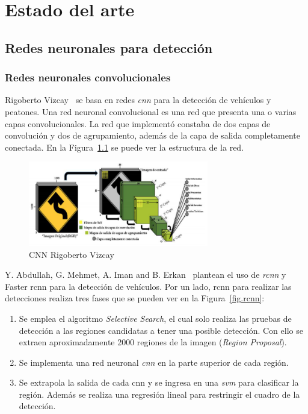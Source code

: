 \chapter{Estado del arte}\label{cap.estado}

\section{Redes neuronales para detección}
\label{sec:nets}


\subsection{Redes neuronales convolucionales}

Rigoberto Vizcay~\cite{tesis_rigoberto} se basa en redes \textit{\acrfull{cnn}} para la detección de vehículos y peatones. Una red neuronal convolucional es una red que presenta una o varias capas convolucionales. La red que implementó constaba de dos capas de convolución y dos de agrupamiento, además de la capa de salida completamente conectada. En la Figura~\ref{fig.cnn_estado_arte} se puede ver la estructura de la red.

\begin{figure}[H]
  \begin{center}
    \includegraphics[width=0.7\textwidth]{figures/estado_arte/cnn.png}
		\caption{CNN Rigoberto Vizcay~\cite{tesis_rigoberto}}
		\label{fig.cnn_estado_arte}
		\end{center}
\end{figure}

Y. Abdullah, G. Mehmet, A. Iman and B. Erkan~\cite{rcnn_detection}  plantean el uso de \textit{\acrfull{rcnn}} y Faster \acrshort{rcnn} para la detección de vehículos. Por un lado, \acrshort{rcnn} para realizar las detecciones realiza tres fases que se pueden ver en la Figura~\ref{fig.rcnn}:
\begin{enumerate}
    \item Se emplea el algoritmo \textit{Selective Search}, el cual solo realiza las pruebas de detección a las regiones candidatas a tener una posible detección. Con ello se extraen aproximadamente 2000 regiones de la imagen (\textit{Region Proposal}).
    \item Se implementa una red neuronal \textit{\acrfull{cnn}} en la parte superior de cada región.
    \item Se extrapola la salida de cada \acrshort{cnn} y se ingresa en una \textit{\acrfull{svm}} para clasificar la región. Además se realiza una regresión lineal para restringir el cuadro de la detección.
\end{enumerate}


